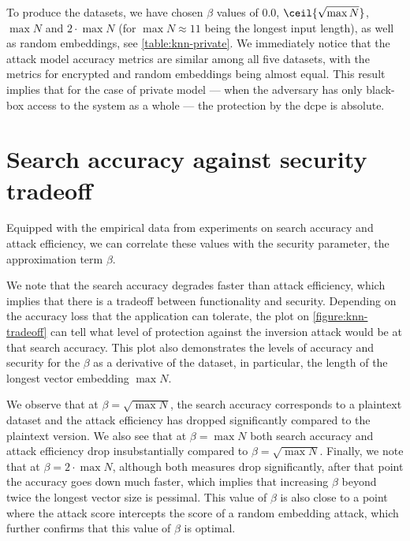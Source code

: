 				

				To produce the datasets, we have chosen $\beta$ values of $0.0$, $\ceil{\sqrt{\max N}}$, $\max N$ and $2 \cdot \max N$ (for $\max N \approx 11$ being the longest input length), as well as random embeddings, see \cref{table:knn-private}.
				We immediately notice that the attack model accuracy metrics are similar among all five datasets, with the metrics for encrypted and random embeddings being almost equal.
				This result implies that for the case of private model --- when the adversary has only black-box access to the system as a whole --- the protection by the \acrshort{dcpe} is absolute.

	\section{Search accuracy against security tradeoff}

		Equipped with the empirical data from \kanon{} experiments on search accuracy and attack efficiency, we can correlate these values with the security parameter, the approximation term $\beta$.

		

		We note that the search accuracy degrades faster than attack efficiency, which implies that there is a tradeoff between functionality and security.
		Depending on the accuracy loss that the application can tolerate, the plot on \cref{figure:knn-tradeoff} can tell what level of protection against the inversion attack would be at that search accuracy.
		This plot also demonstrates the levels of accuracy and security for the $\beta$ as a derivative of the dataset, in particular, the length of the longest vector embedding $\max N$.

		We observe that at $\beta = \sqrt{\max N}$, the search accuracy corresponds to a plaintext dataset and the attack efficiency has dropped significantly compared to the plaintext version.
		We also see that at $\beta = \max N$ both search accuracy and attack efficiency drop insubstantially compared to $\beta = \sqrt{\max N}$.
		Finally, we note that at $\beta = 2 \cdot \max N$, although both measures drop significantly, after that point the accuracy goes down much faster, which implies that increasing $\beta$ beyond twice the longest vector size is pessimal.
		This value of $\beta$ is also close to a point where the attack \FOne{} score intercepts the \FOne{} score of a random embedding attack, which further confirms that this value of $\beta$ is optimal.

